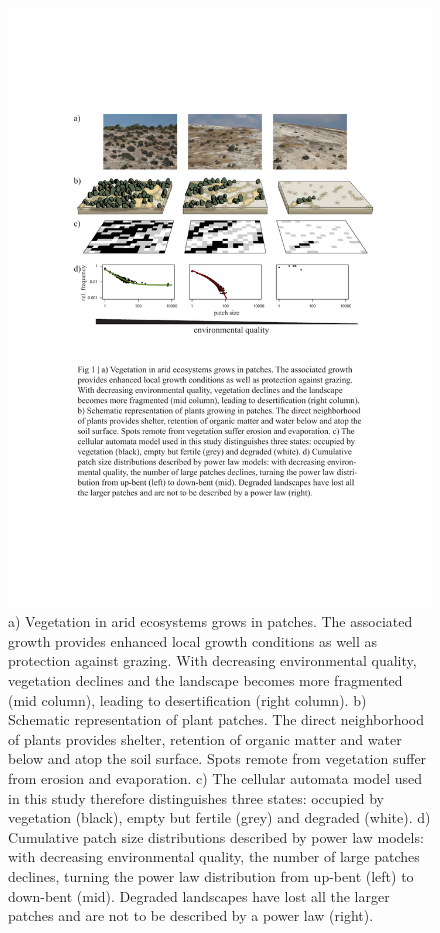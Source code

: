 \begin{figure}[!t]
	\centering
		\includegraphics{figures/fig1.pdf}
	\caption{a) Vegetation in arid ecosystems grows in patches. The associated growth provides enhanced local growth conditions as well as protection against grazing. With decreasing environmental quality, vegetation declines and the landscape becomes more fragmented (mid column), leading to desertification (right column). b) Schematic representation of plant patches. The direct neighborhood of plants provides shelter, retention of organic matter and water below and atop the soil surface. Spots remote from vegetation suffer from erosion and evaporation. c) The cellular automata model used in this study therefore distinguishes three states: occupied by vegetation (black), empty but fertile (grey) and degraded (white). d) Cumulative patch size distributions described by power law models: with decreasing environmental quality, the number of large patches declines, turning the power law distribution from up-bent (left) to down-bent (mid). Degraded landscapes have lost all the larger patches and are not to be described by a power law (right). }
	\label{fig:fig1}
\end{figure}


